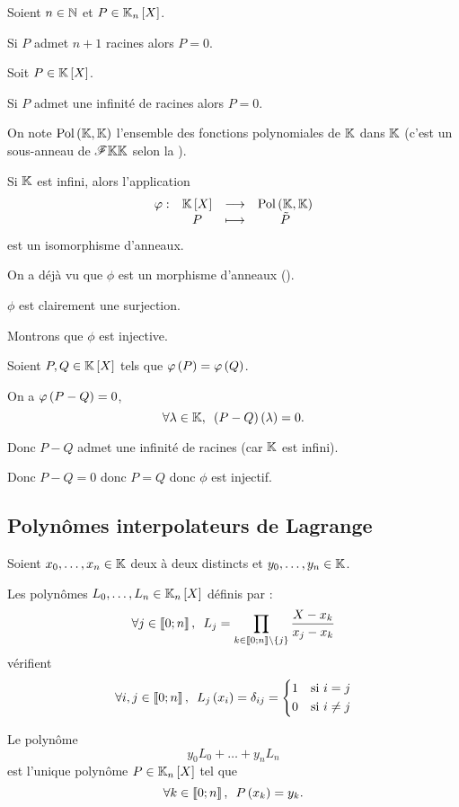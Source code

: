 \begin{cor}
Soient \(n\in\mathbb{N}\) et \(P\in\polydeg{n}\).

Si \(P\) admet \(n+1\) racines alors \(P=0\).
\end{cor}

\begin{cor}
Soit \(P\in\poly\).

Si \(P\) admet une infinité de racines alors \(P=0\).
\end{cor}

\begin{cor}
On note \(\operatorname{Pol}\left(\mathbb{K},\mathbb{K}\right)\) l'ensemble des fonctions polynomiales de \(\mathbb{K}\) dans \(\mathbb{K}\) (c'est un sous-anneau de \(\mathscr{F}{\mathbb{K}}{\mathbb{K}}\) selon la ).

Si \(\mathbb{K}\) est infini, alors l'application \[\fonction{\phi}{\poly}{\Pol{\K}{\K}}{P}{\tilde{P}}\] est un isomorphisme d'anneaux.
\end{cor}

\begin{dem}
On a déjà vu que \(\phi\) est un morphisme d'anneaux (\cf {}).

\(\phi\) est clairement une surjection.

Montrons que \(\phi\) est injective.

Soient \(P,Q\in\poly\) tels que \(\varphi\left(P\right)=\varphi\left(Q\right)\).

On a \(\varphi\left(P-Q\right)=0\), \cad \[\quantifs{\forall\lambda\in\K}\paren{P-Q}\paren{\lambda}=0.\]

Donc \(P-Q\) admet une infinité de racines (car \(\mathbb{K}\) est infini).

Donc \(P-Q=0\) donc \(P=Q\) donc \(\phi\) est injectif.
\end{dem}

\subsection{Polynômes interpolateurs de Lagrange}

\begin{defprop}
Soient \(x_0,\dots,x_n\in\mathbb{K}\) deux à deux distincts et \(y_0,\dots,y_n\in\mathbb{K}\).

Les polynômes \(L_0,\dots,L_n\in\polydeg{n}\) définis par : \[\quantifs{\forall j\in\interventierii{0}{n}}L_j=\prod_{k\in\interventierii{0}{n}\excluant\accol{j}}\dfrac{X-x_k}{x_j-x_k}\] vérifient \[\quantifs{\forall i,j\in\interventierii{0}{n}}L_j\paren{x_i}=\delta_{ij}=\begin{dcases}1 &\text{si }i=j \\ 0 &\text{si }i\not=j\end{dcases}\]

Le polynôme \[y_0L_0+\dots+y_nL_n\] est l'unique polynôme \(P\in\polydeg{n}\) tel que \[\quantifs{\forall k\in\interventierii{0}{n}}P\paren{x_k}=y_k.\]
\end{defprop}

